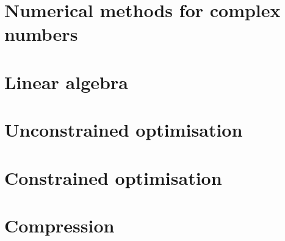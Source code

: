 \documentclass[oneside]{book}
\begin{document}
\part{Numerical methods for complex numbers}


\part{Linear algebra}









\part{Unconstrained optimisation}





\part{Constrained optimisation}


\part{Compression}

\end{document}
